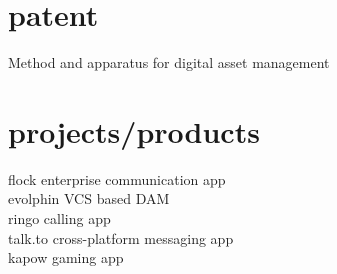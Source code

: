 \begin{minipage}[t]{0.33\textwidth}
\sectionspace %


\section{patent}
Method and apparatus for digital asset management \href{https://patents.google.com/patent/US8868506B1/en?inventor=Kunjan+Aggarwal}{\faChain}
\sectionspace %


\section{projects/products}
flock enterprise communication app \href{https://flock.com}{\faChain} \\
evolphin VCS based DAM \href{https://evolphin.com/}{\faChain} \\
ringo calling app \href{https://www.ringo.co/}{\faChain}\\
talk.to cross-platform messaging app \\
kapow gaming app \\

\end{minipage} %
\hfill
%
%
